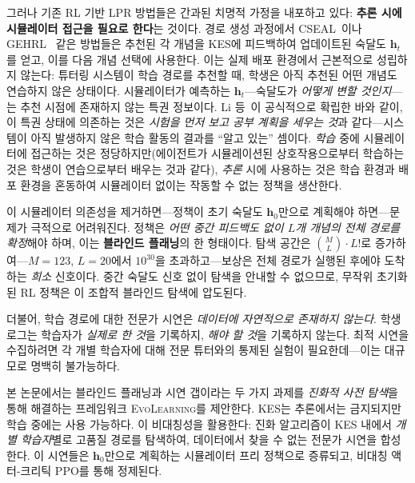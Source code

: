 \documentclass[11pt,a4paper]{article}
\newcommand{\ours}{\textsc{EvoLearning}}
\begin{document}
그러나 기존 RL 기반 LPR 방법들은 간과된 치명적 가정을 내포하고 있다: \textbf{추론 시에 시뮬레이터 접근을 필요로 한다}는 것이다. 경로 생성 과정에서 CSEAL~\cite{liu2019cseal}이나 GEHRL~\cite{li2023gehrl} 같은 방법들은 추천된 각 개념을 KES에 피드백하여 업데이트된 숙달도 $\mathbf{h}_t$를 얻고, 이를 다음 개념 선택에 사용한다. 이는 실제 배포 환경에서 근본적으로 성립하지 않는다: 튜터링 시스템이 학습 경로를 추천할 때, 학생은 아직 추천된 어떤 개념도 연습하지 않은 상태이다. 시뮬레이터가 예측하는 $\mathbf{h}_t$---숙달도가 \emph{어떻게 변할 것인지}---는 추천 시점에 존재하지 않는 특권 정보이다. Li 등~\cite{li2024privileged}이 공식적으로 확립한 바와 같이, 이 특권 상태에 의존하는 것은 \emph{시험을 먼저 보고 공부 계획을 세우는 것}과 같다---시스템이 아직 발생하지 않은 학습 활동의 결과를 ``알고 있는'' 셈이다. \emph{학습} 중에 시뮬레이터에 접근하는 것은 정당하지만(에이전트가 시뮬레이션된 상호작용으로부터 학습하는 것은 학생이 연습으로부터 배우는 것과 같다), \emph{추론} 시에 사용하는 것은 학습 환경과 배포 환경을 혼동하여 시뮬레이터 없이는 작동할 수 없는 정책을 생산한다.

이 시뮬레이터 의존성을 제거하면---정책이 초기 숙달도 $\mathbf{h}_0$만으로 계획해야 하면---문제가 극적으로 어려워진다. 정책은 \emph{어떤 중간 피드백도 없이 $L$개 개념의 전체 경로를 확정}해야 하며, 이는 \textbf{블라인드 플래닝}의 한 형태이다. 탐색 공간은 $\binom{M}{L} \cdot L!$로 증가하여---$M=123$, $L=20$에서 $10^{30}$을 초과하고---보상은 전체 경로가 실행된 후에야 도착하는 \emph{희소} 신호이다. 중간 숙달도 신호 없이 탐색을 안내할 수 없으므로, 무작위 초기화된 RL 정책은 이 조합적 블라인드 탐색에 압도된다.

더불어, 학습 경로에 대한 전문가 시연은 \emph{데이터에 자연적으로 존재하지 않는다}. 학생 로그는 학습자가 \emph{실제로 한 것}을 기록하지, \emph{해야 할 것}을 기록하지 않는다. 최적 시연을 수집하려면 각 개별 학습자에 대해 전문 튜터와의 통제된 실험이 필요한데---이는 대규모로 명백히 불가능하다.

본 논문에서는 블라인드 플래닝과 시연 갭이라는 두 가지 과제를 \emph{진화적 사전 탐색}을 통해 해결하는 프레임워크 \ours{}를 제안한다. KES는 추론에서는 금지되지만 학습 중에는 사용 가능하다. 이 비대칭성을 활용한다: 진화 알고리즘이 KES 내에서 \emph{개별 학습자}별로 고품질 경로를 탐색하여, 데이터에서 찾을 수 없는 전문가 시연을 합성한다. 이 시연들은 $\mathbf{h}_0$만으로 계획하는 시뮬레이터 프리 정책으로 증류되고, 비대칭 액터-크리틱 PPO를 통해 정제된다.
\end{document}
